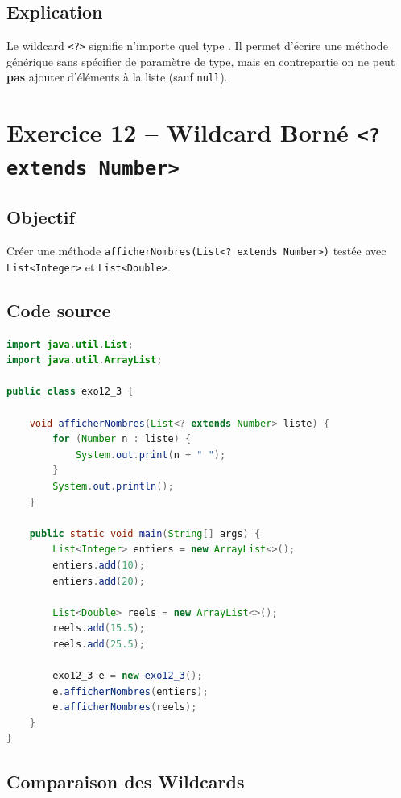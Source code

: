 \subsection{Explication}

Le wildcard \texttt{<?>} signifie \og n'importe quel type \fg{}. Il permet
d'écrire une méthode générique sans spécifier de paramètre de type, mais
en contrepartie on ne peut \textbf{pas} ajouter d'éléments à la liste
(sauf \texttt{null}).

\section{Exercice 12 -- Wildcard Borné \texttt{<? extends Number>}}

\subsection{Objectif}

Créer une méthode \texttt{afficherNombres(List<? extends Number>)} testée
avec \texttt{List<Integer>} et \texttt{List<Double>}.

\subsection{Code source}

\begin{lstlisting}[language=Java, caption={exo12\_3.java -- Wildcard borné}]
import java.util.List;
import java.util.ArrayList;

public class exo12_3 {

    void afficherNombres(List<? extends Number> liste) {
        for (Number n : liste) {
            System.out.print(n + " ");
        }
        System.out.println();
    }

    public static void main(String[] args) {
        List<Integer> entiers = new ArrayList<>();
        entiers.add(10);
        entiers.add(20);

        List<Double> reels = new ArrayList<>();
        reels.add(15.5);
        reels.add(25.5);

        exo12_3 e = new exo12_3();
        e.afficherNombres(entiers);
        e.afficherNombres(reels);
    }
}
\end{lstlisting}

\subsection{Comparaison des Wildcards}

